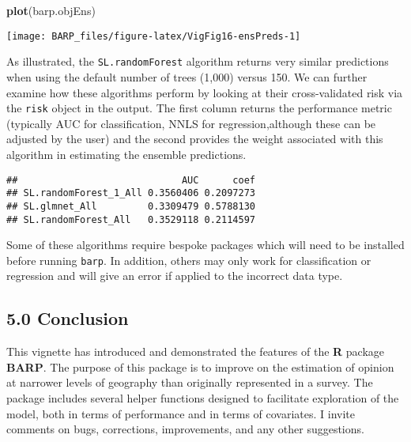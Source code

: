 \documentclass[]{article}
\newenvironment{Shaded}{\begin{snugshade}}{\end{snugshade}}
\newcommand{\KeywordTok}[1]{\textcolor[rgb]{0.13,0.29,0.53}{\textbf{#1}}}
\newcommand{\OperatorTok}[1]{\textcolor[rgb]{0.81,0.36,0.00}{\textbf{#1}}}
\newcommand{\NormalTok}[1]{#1}
\begin{document}
\begin{Shaded}
\begin{Highlighting}[]
\KeywordTok{plot}\NormalTok{(barp.objEns)}
\end{Highlighting}
\end{Shaded}

\begin{center}\texttt{[image: BARP\_files/figure-latex/VigFig16-ensPreds-1]} \end{center}

As illustrated, the \texttt{SL.randomForest} algorithm returns very
similar predictions when using the default number of trees (1,000)
versus 150. We can further examine how these algorithms perform by
looking at their cross-validated risk via the \texttt{risk} object in
the output. The first column returns the performance metric (typically
AUC for classification, NNLS for regression,although these can be
adjusted by the user) and the second provides the weight associated with
this algorithm in estimating the ensemble predictions.

\begin{Shaded}
\end{Shaded}

\begin{verbatim}
##                             AUC      coef
## SL.randomForest_1_All 0.3560406 0.2097273
## SL.glmnet_All         0.3309479 0.5788130
## SL.randomForest_All   0.3529118 0.2114597
\end{verbatim}

Some of these algorithms require bespoke packages which will need to be
installed before running \texttt{barp}. In addition, others may only
work for classification or regression and will give an error if applied
to the incorrect data type.

\subsection{5.0 Conclusion}\label{conclusion}

This vignette has introduced and demonstrated the features of the
\textbf{R} package \textbf{BARP}. The purpose of this package is to
improve on the estimation of opinion at narrower levels of geography
than originally represented in a survey. The package includes several
helper functions designed to facilitate exploration of the model, both
in terms of performance and in terms of covariates. I invite comments on
bugs, corrections, improvements, and any other suggestions.
\end{document}
